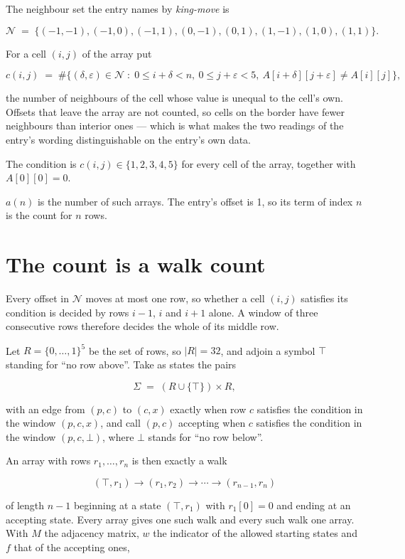\documentclass[11pt]{article}
\theoremstyle{definition}
\begin{document}
The neighbour set the entry names by {\itshape king-move} is

\[\mathcal{N} \;=\; \{(-1,-1), (-1,0), (-1,1), (0,-1), (0,1), (1,-1), (1,0), (1,1)\}.\]

For a cell $(i,j)$ of the array put

\[c(i,j) \;=\; \#\bigl\{(\delta,\varepsilon)\in\mathcal{N} \;:\; 0\le i+\delta<n,\ 0\le j+\varepsilon<5,\ A[i+\delta][j+\varepsilon] \neq A[i][j]\bigr\},\]

the number of neighbours of the cell whose value is unequal to the cell's own. Offsets that leave the array are not counted, so cells on the border have fewer neighbours than interior ones --- which is what makes the two readings of the entry's wording distinguishable on the entry's own data.

The condition is $c(i,j) \in \{1, 2, 3, 4, 5\}$ for every cell of the array, together with $A[0][0]=0$.

$a(n)$ is the number of such arrays. The entry's offset is 1, so its term of index $n$ is the count for $n$ rows.

\section{The count is a walk count}

Every offset in $\mathcal{N}$ moves at most one row, so whether a cell $(i,j)$ satisfies its condition is decided by rows $i-1$, $i$ and $i+1$ alone. A window of three consecutive rows therefore decides the whole of its middle row.

Let $R = \{0,\dots,1\}^{5}$ be the set of rows, so $|R| = 32$, and adjoin a symbol $\top$ standing for ``no row above''. Take as states the pairs

\[\Sigma \;=\; (R \cup \{\top\}) \times R,\]

with an edge from $(p,c)$ to $(c,x)$ exactly when row $c$ satisfies the condition in the window $(p,c,x)$, and call $(p,c)$ accepting when $c$ satisfies the condition in the window $(p,c,\bot)$, where $\bot$ stands for ``no row below''.

An array with rows $r_1,\dots,r_n$ is then exactly a walk

\[(\top,r_1) \to (r_1,r_2) \to \cdots \to (r_{n-1},r_n)\]

of length $n-1$ beginning at a state $(\top,r_1)$ with $r_1[0]=0$ and ending at an accepting state. Every array gives one such walk and every such walk one array. With $M$ the adjacency matrix, $w$ the indicator of the allowed starting states and $f$ that of the accepting ones,
\end{document}
